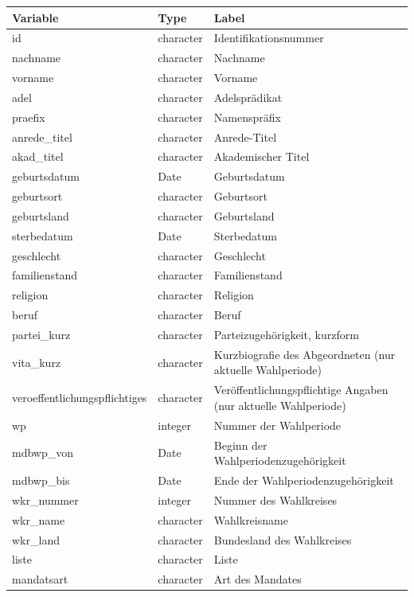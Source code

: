 \documentclass[12pt]{article}
\begin{document}
{\scriptsize

\begin{tabular}{l|l|l}
\hline
Variable & Type & Label\\
\hline
id & character & Identifikationsnummer\\
\hline
nachname & character & Nachname\\
\hline
vorname & character & Vorname\\
\hline
adel & character & Adelsprädikat\\
\hline
praefix & character & Namenspräfix\\
\hline
anrede\_titel & character & Anrede-Titel\\
\hline
akad\_titel & character & Akademischer Titel\\
\hline
geburtsdatum & Date & Geburtsdatum\\
\hline
geburtsort & character & Geburtsort\\
\hline
geburtsland & character & Geburtsland\\
\hline
sterbedatum & Date & Sterbedatum\\
\hline
geschlecht & character & Geschlecht\\
\hline
familienstand & character & Familienstand\\
\hline
religion & character & Religion\\
\hline
beruf & character & Beruf\\
\hline
partei\_kurz & character & Parteizugehörigkeit, kurzform\\
\hline
vita\_kurz & character & Kurzbiografie des Abgeordneten (nur aktuelle Wahlperiode)\\
\hline
veroeffentlichungspflichtiges & character & Veröffentlichungspflichtige Angaben (nur aktuelle Wahlperiode)\\
\hline
wp & integer & Nummer der Wahlperiode\\
\hline
mdbwp\_von & Date & Beginn der Wahlperiodenzugehörigkeit\\
\hline
mdbwp\_bis & Date & Ende der Wahlperiodenzugehörigkeit\\
\hline
wkr\_nummer & integer & Nummer des Wahlkreises\\
\hline
wkr\_name & character & Wahlkreisname\\
\hline
wkr\_land & character & Bundesland des Wahlkreises\\
\hline
liste & character & Liste\\
\hline
mandatsart & character & Art des Mandates\\
\hline
\end{tabular}

}
\end{document}
